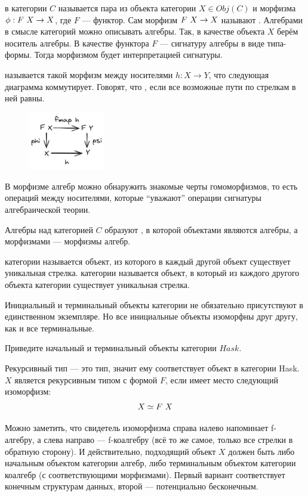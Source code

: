 в категории $C$ называется пара из объекта категории $X \in Obj(C)$ и морфизма $\phi : F~ X \to X$, где $F$ --- функтор.
Сам морфизм $F~ X \to X$ называют .
Алгебрами в смысле категорий можно описывать алгебры.
Так, в качестве объекта $X$ берём носитель алгебры.
В качестве функтора $F$ --- сигнатуру алгебры в виде типа-формы.
Тогда морфизмом будет интерпретацией сигнатуры.

 называется такой морфизм между носителями $h : X \to Y$, что следующая диаграмма коммутирует.
Говорят, что , если все возможные пути по стрелкам в ней равны.
\begin{figure}[h!]
    \centering
    \includegraphics[width=0.3\textwidth]{figs/alg-homomorphism}
\end{figure}

В морфизме алгебр можно обнаружить знакомые черты гомоморфизмов, то есть операций между носителями, которые ``уважают'' операции сигнатуры алгебраической теории.

Алгебры над категорией $C$ образуют , в которой объектами являются алгебры, а морфизмами --- морфизмы алгебр.

 категории называется объект, из которого в каждый другой объект существует уникальная стрелка.
 категории называется объект, в который из каждого другого объекта категории существует уникальная стрелка.

Инициальный и терминальный объекты категории не обязательно присутствуют в единственном экземпляре.
Но все инициальные объекты изоморфны друг другу, как и все терминальные.

\begin{task}
    Приведите начальный и терминальный объекты категории $Hask$.
\end{task}

Рекурсивный тип --- это тип, значит ему соответствует объект в категории Hask.
$X$ является рекурсивным типом с формой $F$, если имеет место следующий изоморфизм:
\[X \simeq F~ X\]

Можно заметить, что свидетель изоморфизма справа налево напоминает f-алгебру, а слева направо --- f-коалгебру (всё то же самое, только все стрелки в обратную сторону).
И действительно, подходящий объект $X$ должен быть либо начальным объектом категории алгебр, либо терминальным объектом категории коалгебр (с соответствующими морфизмами).
Первый вариант соответствует конечным структурам данных, второй --- потенциально бесконечным.

